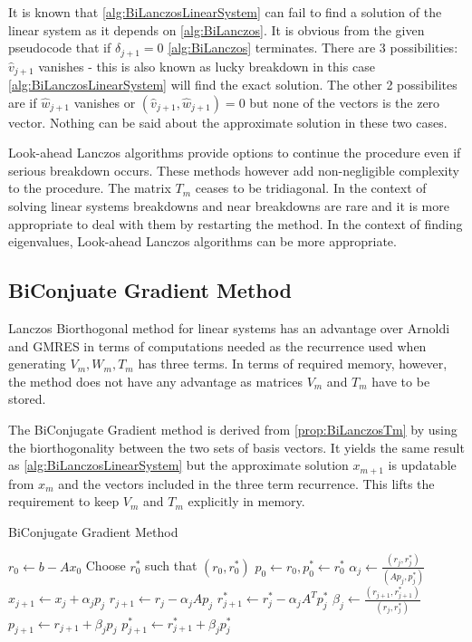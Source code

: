 It is known that \cref{alg:BiLanczosLinearSystem} can fail to find a solution of the linear system as it depends on \cref{alg:BiLanczos}. It is obvious from the given pseudocode that if $\delta_{j+1} = 0$ \cref{alg:BiLanczos} terminates. There are 3 possibilities: $\hat{v}_{j+1}$ vanishes - this is also known as lucky breakdown in this case \cref{alg:BiLanczosLinearSystem} will find the exact solution. The other 2 possibilites are if $\hat{w}_{j+1}$ vanishes or $(\hat{v}_{j+1}, \hat{w}_{j+1}) = 0$ but none of the vectors is the zero vector. Nothing can be said about the approximate solution in these two cases.

Look-ahead Lanczos algorithms provide options to continue the procedure even if serious breakdown occurs. These methods however add non-negligible complexity to the procedure. The matrix $T_m$ ceases to be tridiagonal. In the context of solving linear systems breakdowns and near breakdowns are rare and it is more appropriate to deal with them by restarting the method. In the context of finding eigenvalues, Look-ahead Lanczos algorithms can be more appropriate.

\subsection{BiConjuate Gradient Method}
Lanczos Biorthogonal method for linear systems has an advantage over Arnoldi and GMRES in terms of computations needed as the recurrence used when generating $V_m, W_m, T_m$ has three terms. In terms of required memory, however, the method does not have any advantage as matrices $V_m$ and $T_m$ have to be stored.

The BiConjugate Gradient method is derived from \cref{prop:BiLanczosTm} by using the biorthogonality between the two sets of basis vectors. It yields the same result as \cref{alg:BiLanczosLinearSystem} but the approximate solution $x_{m+1}$ is updatable from $x_m$ and the vectors included in the three term recurrence. This lifts the requirement to keep $V_m$ and $T_m$ explicitly in memory.

\begin{algorithm}[H]
 \centering
 \caption{BiConjugate Gradient Method}\label{alg:BiCG}
 \begin{algorithmic}[1]
			\State $r_0 \gets b - Ax_0$
			\State Choose $r^*_0$ such that $(r_0, r^*_0)$
			\State $p_0 \gets r_0, p^*_0 \gets r^*_0$
				\State $\alpha_j \gets \frac{(r_j, r^*_j)}{(Ap_j, p^*_j)}$ \label{algln:BiCG_Breakdown1}
				\State $x_{j+1} \gets x_j + \alpha_j p_j$
				\State $r_{j+1} \gets r_j - \alpha_j Ap_j$
				\State $r^*_{j+1} \gets r^*_j - \alpha_j A^T p^*_j$
				\State $\beta_j \gets \frac{(r_{j+1}, r^*_{j+1})}{(r_j, r^*_j)}$ \label{algln:BiCG_Breakdown2}
				\State $p_{j+1} \gets r_{j+1} + \beta_j p_j$
				\State $p^*_{j+1} \gets r^*_{j+1} + \beta_j p^*_j$
			\EndFor
		\EndProcedure
 \end{algorithmic}
\end{algorithm}

